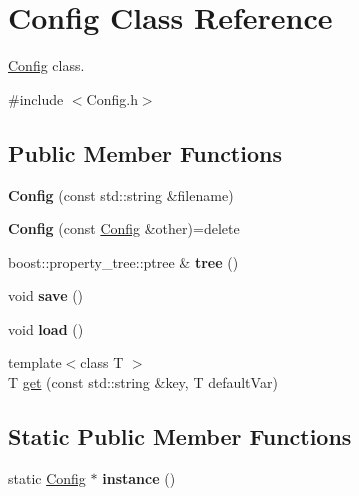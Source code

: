 \hypertarget{class_config}{\section{Config Class Reference}
\label{class_config}
}


\hyperlink{class_config}{Config} class.  




{\ttfamily \#include $<$Config.\-h$>$}

\subsection*{Public Member Functions}
\begin{DoxyCompactItemize}
\item 
\hypertarget{class_config_abc51a2c710c8666d27b53cc03597201d}{{\bfseries Config} (const std\-::string \&filename)}\label{class_config_abc51a2c710c8666d27b53cc03597201d}

\item 
\hypertarget{class_config_aea1b7e862074892ee39a5583c342c482}{{\bfseries Config} (const \hyperlink{class_config}{Config} \&other)=delete}\label{class_config_aea1b7e862074892ee39a5583c342c482}

\item 
\hypertarget{class_config_a006701bd126aa5809b3a15e75c63bfb6}{boost\-::property\-\_\-tree\-::ptree \& {\bfseries tree} ()}\label{class_config_a006701bd126aa5809b3a15e75c63bfb6}

\item 
\hypertarget{class_config_ae7e68962f22a2c965a61702de1c637db}{void {\bfseries save} ()}\label{class_config_ae7e68962f22a2c965a61702de1c637db}

\item 
\hypertarget{class_config_add4ebd0c89505c9b5368f03264555606}{void {\bfseries load} ()}\label{class_config_add4ebd0c89505c9b5368f03264555606}

\item 
{\footnotesize template$<$class T $>$ }\\T \hyperlink{class_config_a1f8e429f853f20cac7cf128f2b71543e}{get} (const std\-::string \&key, T default\-Var)
\end{DoxyCompactItemize}
\subsection*{Static Public Member Functions}
\begin{DoxyCompactItemize}
\item 
\hypertarget{class_config_abf1d4539011ef83cac0fef2ac864a3a9}{static \hyperlink{class_config}{Config} $\ast$ {\bfseries instance} ()}\label{class_config_abf1d4539011ef83cac0fef2ac864a3a9}

\end{DoxyCompactItemize}


